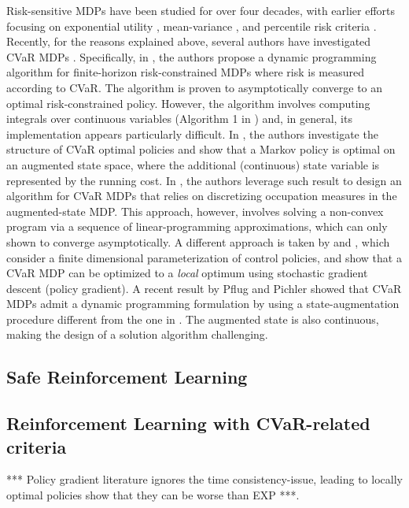 Risk-sensitive MDPs have been studied for over four decades, with earlier efforts focusing on exponential utility \cite{Howard1972Risk}, mean-variance \cite{sobel_variance_1982}, and percentile risk criteria \cite{filar_percentile_1995} . Recently, for the reasons explained above, several authors have investigated CVaR MDPs \cite{rockafellar2000optimization}. Specifically, in \cite{borkar2014risk}, the authors propose a dynamic programming algorithm for finite-horizon risk-constrained MDPs where risk is measured according to CVaR. The algorithm is proven to asymptotically converge to an optimal risk-constrained policy. However, the algorithm involves computing  integrals over continuous variables (Algorithm 1 in \cite{borkar2014risk}) and, in general, its implementation appears particularly difficult. In \cite{bauerle2011markov}, the authors investigate the structure of CVaR optimal policies and show that a Markov policy is optimal on an augmented state space, where the additional (continuous) state variable is represented  by the running cost. In   \cite{haskell2014convex}, the authors leverage such result to design an algorithm for CVaR MDPs that relies on discretizing occupation measures in the augmented-state MDP. This approach, however, involves solving a non-convex program via a sequence of linear-programming approximations, which can only shown to converge asymptotically. A different approach is taken by \cite{chow2014cvar} and \cite{tamar2015optimizing}, which consider a finite dimensional parameterization of control  policies, and show that a CVaR MDP can be optimized to a \emph{local} optimum using stochastic gradient descent (policy gradient). A recent result by Pflug and Pichler \cite{pflug2012time} showed that CVaR MDPs admit a dynamic programming formulation by using a state-augmentation procedure different from the one in \cite{bauerle2011markov}. The augmented state  is also continuous, making the design of a solution algorithm challenging. 

\subsection{Safe Reinforcement Learning}

\citep{amodei2016concrete}
\citep{garcia2015comprehensive}
\citep{leike2017ai}
\citep{majumdar2017should}





\subsection{Reinforcement Learning with CVaR-related criteria}

*** Policy gradient literature ignores the time consistency-issue, leading to locally optimal policies show that they can be worse than EXP ***.
